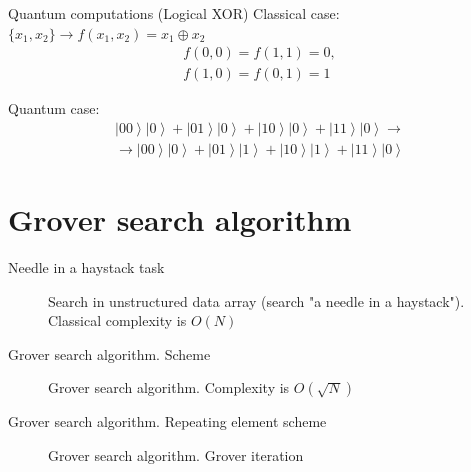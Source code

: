 \documentclass[10pt,pdf,hyperref={unicode}]{beamer}
\begin{document}
\begin{frame}{Quantum computations (Logical XOR)}
Classical case: $\{x_1, x_2\} \to f(x_1, x_2) = x_1 \oplus x_2$
\begin{eqnarray}
  f(0,0) = f(1,1) = 0,
  \nonumber \\
  f(1,0) = f(0,1) = 1
  \nonumber
\end{eqnarray}

Quantum case:
\begin{eqnarray}
  \left|00\right>\left|0\right> + \left|01\right>\left|0\right> +
  \left|10\right>\left|0\right> + \left|11\right>\left|0\right> \to
  \nonumber \\
  \to
  \left|00\right>\left|0\right> + \left|01\right>\left|1\right> +
  \left|10\right>\left|1\right> + \left|11\right>\left|0\right>
\nonumber
\end{eqnarray}
\end{frame}


\section{Grover search algorithm}
\begin{frame}{Needle in a haystack task}
\begin{figure}
\centering



\caption{Search in unstructured data array (search "a needle in a
  haystack"). Classical complexity is $O(N)$}
\label{figQuantCompSearch}
\end{figure}
\end{frame}

\begin{frame}{Grover search algorithm. Scheme}
\begin{figure}
\centering

\scalebox{1.0}{}

\caption{Grover search algorithm. Complexity is $ O(\sqrt{N})$}
\label{figQuantCompGrover}
\end{figure}
\end{frame}

\begin{frame}{Grover search algorithm. Repeating element scheme}
\begin{figure}
\centering

\scalebox{1.0}{}

\caption{Grover search algorithm. Grover iteration}
\label{figQuantCompGrover}
\end{figure}
\end{frame}
\end{document}
